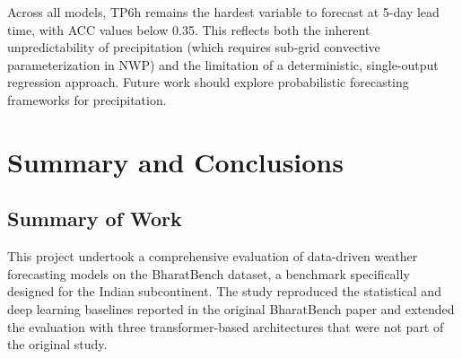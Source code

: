 \documentclass[12pt,a4paper,oneside]{report}
\begin{document}
Across all models, TP6h remains the hardest variable to forecast at 5-day lead time, with ACC values below 0.35. This reflects both the inherent unpredictability of precipitation (which requires sub-grid convective parameterization in NWP) and the limitation of a deterministic, single-output regression approach. Future work should explore probabilistic forecasting frameworks for precipitation.

\chapter{Summary and Conclusions}

\section{Summary of Work}

This project undertook a comprehensive evaluation of data-driven weather forecasting models on the BharatBench dataset, a benchmark specifically designed for the Indian subcontinent. The study reproduced the statistical and deep learning baselines reported in the original BharatBench paper and extended the evaluation with three transformer-based architectures that were not part of the original study.
\end{document}
